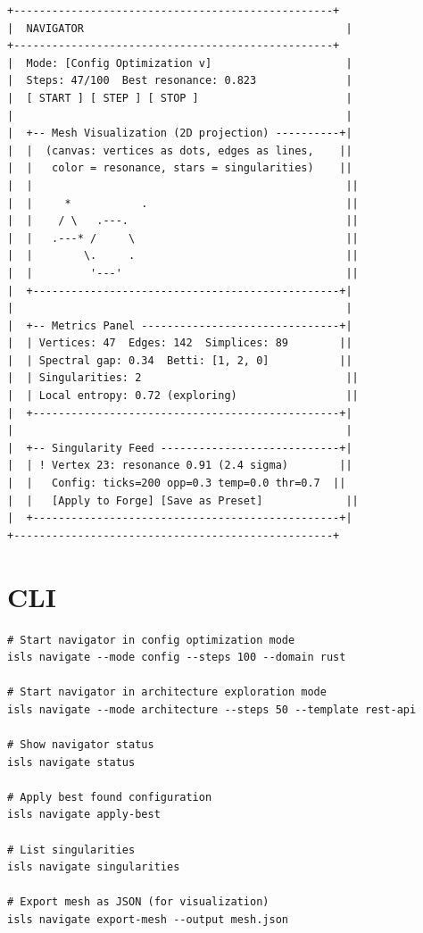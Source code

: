 \documentclass[11pt,a4paper,twoside]{article}
\theoremstyle{definition}
\theoremstyle{plain}
\theoremstyle{remark}
\begin{document}
\begin{lstlisting}[title={New Studio View: Navigator}]
+--------------------------------------------------+
|  NAVIGATOR                                         |
+--------------------------------------------------+
|  Mode: [Config Optimization v]                     |
|  Steps: 47/100  Best resonance: 0.823              |
|  [ START ] [ STEP ] [ STOP ]                       |
|                                                    |
|  +-- Mesh Visualization (2D projection) ----------+|
|  |  (canvas: vertices as dots, edges as lines,    ||
|  |   color = resonance, stars = singularities)    ||
|  |                                                 ||
|  |     *           .                               ||
|  |    / \   .---.                                  ||
|  |   .---* /     \                                 ||
|  |        \.     .                                 ||
|  |         '---'                                   ||
|  +------------------------------------------------+|
|                                                    |
|  +-- Metrics Panel -------------------------------+|
|  | Vertices: 47  Edges: 142  Simplices: 89        ||
|  | Spectral gap: 0.34  Betti: [1, 2, 0]           ||
|  | Singularities: 2                                ||
|  | Local entropy: 0.72 (exploring)                 ||
|  +------------------------------------------------+|
|                                                    |
|  +-- Singularity Feed ----------------------------+|
|  | ! Vertex 23: resonance 0.91 (2.4 sigma)        ||
|  |   Config: ticks=200 opp=0.3 temp=0.0 thr=0.7  ||
|  |   [Apply to Forge] [Save as Preset]             ||
|  +------------------------------------------------+|
+--------------------------------------------------+
\end{lstlisting}


\part{CLI}\label{part:cli}

\begin{lstlisting}
# Start navigator in config optimization mode
isls navigate --mode config --steps 100 --domain rust

# Start navigator in architecture exploration mode
isls navigate --mode architecture --steps 50 --template rest-api

# Show navigator status
isls navigate status

# Apply best found configuration
isls navigate apply-best

# List singularities
isls navigate singularities

# Export mesh as JSON (for visualization)
isls navigate export-mesh --output mesh.json
\end{lstlisting}
\end{document}
